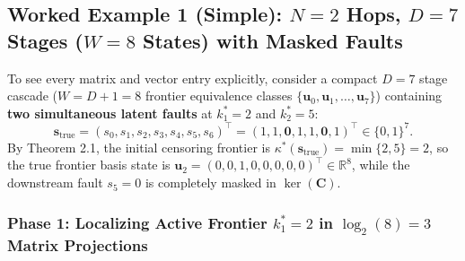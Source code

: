 \documentclass[11pt,a4paper]{article}
\theoremstyle{definition}
\theoremstyle{remark}
\begin{document}
\subsection{Worked Example 1 (Simple): $N=2$ Hops, $D=7$ Stages ($W=8$ States) with Masked Faults}

To see every matrix and vector entry explicitly, consider a compact $D=7$ stage cascade ($W = D+1 = 8$ frontier equivalence classes $\{\bm{u}_0, \bm{u}_1, \dots, \bm{u}_7\}$) containing \textbf{two simultaneous latent faults} at $k_1^* = 2$ and $k_2^* = 5$:
\begin{equation}
    \bm{s}_{\text{true}} = (s_0, s_1, s_2, s_3, s_4, s_5, s_6)^\top = (1, 1, \mathbf{0}, 1, 1, \mathbf{0}, 1)^\top \in \{0,1\}^7.
\end{equation}
By Theorem 2.1, the initial censoring frontier is $\kappa^*(\bm{s}_{\text{true}}) = \min\{2, 5\} = 2$, so the true frontier basis state is $\bm{u}_2 = (0, 0, 1, 0, 0, 0, 0, 0)^\top \in \mathbb{R}^8$, while the downstream fault $s_5 = 0$ is completely masked in $\ker(\mathbf{C})$.

\subsubsection*{Phase 1: Localizing Active Frontier $k_1^* = 2$ in $\log_2(8) = 3$ Matrix Projections}
\end{document}
